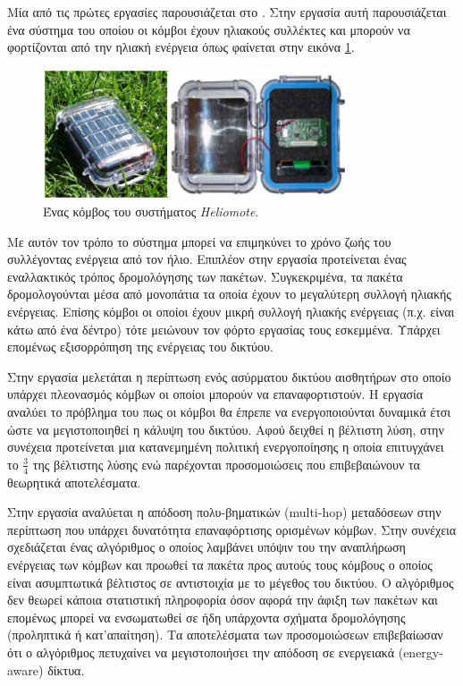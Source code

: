 Μία από τις πρώτες εργασίες παρουσιάζεται στο \cite{heliomote}. Στην εργασία αυτή παρουσιάζεται ένα σύστημα του οποίου οι κόμβοι έχουν ηλιακούς συλλέκτες
και μπορούν να φορτίζονται από την ηλιακή ενέργεια όπως φαίνεται στην εικόνα \ref{fig:heliomote_example}.
\begin{figure}[h]
	\centering
	\includegraphics[width=0.8\textwidth]{images/heliomote_example.eps}
	\caption{Ένας κόμβος του συστήματος \textit{Heliomote}.}
	\label{fig:heliomote_example}
\end{figure}
Με αυτόν τον τρόπο το σύστημα μπορεί να επιμηκύνει το χρόνο ζωής του συλλέγοντας ενέργεια από τον ήλιο. Επιπλέον στην εργασία προτείνεται ένας εναλλακτικός τρόπος
δρομολόγησης των πακέτων. Συγκεκριμένα, τα πακέτα δρομολογούνται μέσα από μονοπάτια τα οποία έχουν το μεγαλύτερη συλλογή ηλιακής ενέργειας. Επίσης κόμβοι οι οποίοι
έχουν μικρή συλλογή ηλιακής ενέργειας (π.χ. είναι κάτω από ένα δέντρο) τότε μειώνουν τον φόρτο εργασίας τους εσκεμμένα. Υπάρχει επομένως εξισορρόπηση της ενέργειας
του δικτύου.

Στην εργασία \cite{harvesting_6} μελετάται η περίπτωση ενός ασύρματου δικτύου αισθητήρων στο οποίο υπάρχει πλεονασμός κόμβων οι οποίοι μπορούν να
επαναφορτιστούν. Η εργασία αναλύει το πρόβλημα του πως οι κόμβοι θα έπρεπε να ενεργοποιούνται δυναμικά έτσι ώστε να μεγιστοποιηθεί η κάλυψη του δικτύου. Αφού δειχθεί
η βέλτιστη λύση, στην συνέχεια προτείνεται μια κατανεμημένη πολιτική ενεργοποίησης η οποία επιτυγχάνει το $\frac{3}{4}$ της βέλτιστης λύσης ενώ παρέχονται
προσομοιώσεις που επιβεβαιώνουν τα θεωρητικά αποτελέσματα.

Στην εργασία \cite{harvesting_7} αναλύεται η απόδοση πολυ-βηματικών (multi-hop) μεταδόσεων στην περίπτωση που υπάρχει δυνατότητα επαναφόρτισης ορισμένων κόμβων. Στην
συνέχεια σχεδιάζεται ένας αλγόριθμος ο οποίος λαμβάνει υπόψιν του την αναπλήρωση ενέργειας των κόμβων και προωθεί τα πακέτα προς αυτούς τους κόμβους ο οποίος είναι
ασυμπτωτικά βέλτιστος σε αντιστοιχία με το μέγεθος του δικτύου. Ο αλγόριθμος δεν θεωρεί κάποια στατιστική πληροφορία όσον αφορά την άφιξη των πακέτων και επομένως
μπορεί να ενσωματωθεί σε ήδη υπάρχοντα σχήματα δρομολόγησης (προληπτικά ή κατ'απαίτηση). Τα αποτελέσματα των προσομοιώσεων επιβεβαίωσαν ότι ο αλγόριθμος πετυχαίνει
να μεγιστοποιήσει την απόδοση σε ενεργειακά (energy-aware) δίκτυα.

